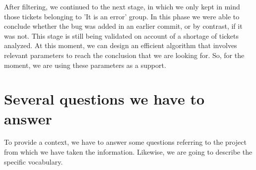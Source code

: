 \documentclass[a4paper]{article}
\begin{document}
After filtering, we continued to the next stage, in which we only kept in mind those tickets belonging to 'It is an error' group. In this phase we were able to conclude whether the bug was added in an earlier commit, or by contrast, if it was not. This stage is still being validated on account of a shortage of tickets analyzed. At this moment, we can design an efficient algorithm that involves relevant parameters to reach the conclusion that we are looking for. So, for the moment, we are using these parameters as a support. 

\section{Several questions we have to answer}

To provide a context, we have to answer some questions referring to the project from which we have taken the information. Likewise, we are going to describe the specific vocabulary. 
\end{document}
